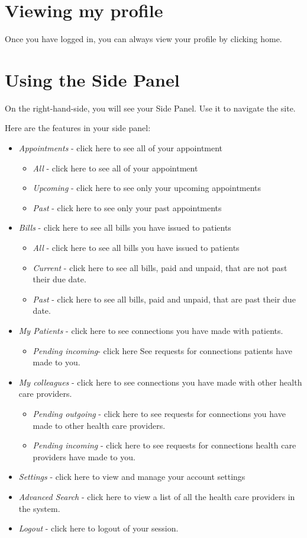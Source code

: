 \documentclass[10pt]{report}
\begin{document}
\section{Viewing my profile}
Once you have logged in, you can always view your profile by clicking home.

\section{Using the Side Panel}
On the right-hand-side, you will see your Side Panel. Use it to navigate the site.

Here are the features in your side panel:
\begin{itemize}
\item \textit{Appointments} - click here to see all of your appointment
\begin{itemize}
\item \textit{All} - click here to see all of your appointment
\item \textit{Upcoming} - click here to see only your upcoming appointments
\item \textit{Past} - click here to see only your past appointments
\end{itemize}
\item \textit{Bills} - click here to see all bills you have issued to patients
\begin{itemize} 
\item \textit{All} - click here to see all bills you have issued to patients
\item \textit{Current} - click here to see all bills, paid and unpaid, that are not past their due date.
\item \textit{Past}  - click here to see all bills, paid and unpaid, that are past their due date.
\end{itemize}
\item \textit{My Patients} - click here to see connections you have made with patients.
\begin{itemize}
\item \textit{Pending incoming}- click here See requests for connections patients have made to you.
\end{itemize}
\item \textit{My colleagues} - click here to see connections you have made with other health care providers.
\begin{itemize}
\item \textit{Pending outgoing} - click here to see requests for connections you have made to other health care providers.
\item \textit{Pending incoming} - click here to see requests for connections health care providers have made to you.
\end{itemize}
\item \textit{Settings} - click here to view and manage your account settings
\item \textit{Advanced Search} - click here to view a list of all the health care providers in the system.
\item \textit{Logout} - click here to logout of your session.
\end{itemize}
\end{document}
